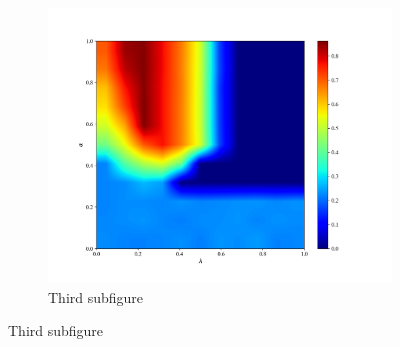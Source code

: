 \documentclass{article}
\begin{document}
\begin{figure}[t!]
\begin{subfigure}{0.48\textwidth}
\includegraphics[width=\linewidth]{b013_0.png}
\caption{Third subfigure} \label{fig:c}
\end{subfigure}\hspace*{\fill}

\medskip


\end{figure}
\end{document}
